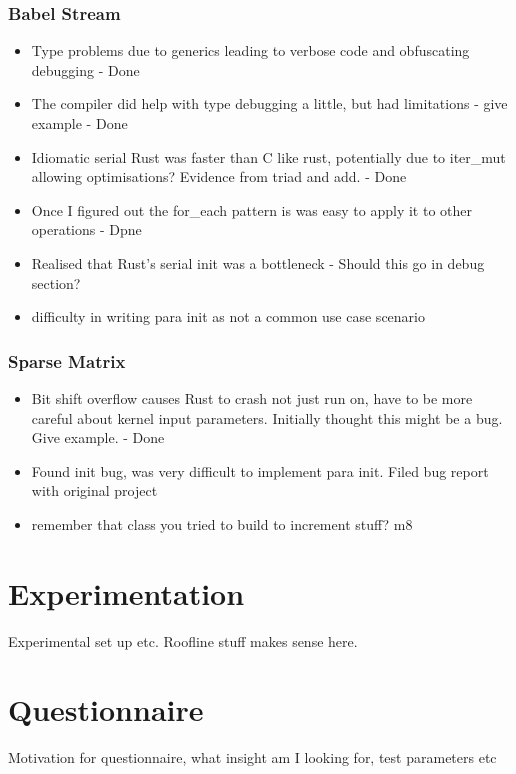 \subsubsection{Babel Stream}
\begin{itemize}
  \item Type problems due to generics leading to verbose code and obfuscating debugging - Done
  \item The compiler did help with type debugging a little, but had limitations - give example - Done
  \item Idiomatic serial Rust was faster than C like rust, potentially due to iter\_mut allowing optimisations? Evidence from triad and add. - Done
  \item Once I figured out the for\_each pattern is was easy to apply it to other operations - Dpne
  \item Realised that Rust's serial init was a bottleneck - Should this go in debug section?
  \item difficulty in writing para init as not a common use case scenario
\end{itemize}

\subsubsection{Sparse Matrix}
\begin{itemize}
  \item Bit shift overflow causes Rust to crash not just run on, have to be more careful about kernel input parameters. Initially thought this might be a bug. Give example. - Done
  \item Found init bug, was very difficult to implement para init. Filed bug report with original project
  \item remember that class you tried to build to increment stuff? m8
\end{itemize}

\section{Experimentation}
Experimental set up etc. Roofline stuff makes sense here.
\section{Questionnaire}
Motivation for questionnaire, what insight am I looking for, test parameters etc

